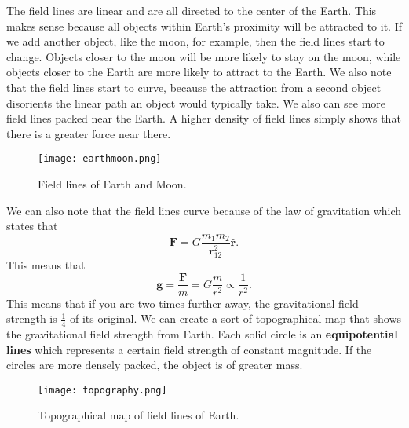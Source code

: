 \documentclass[12pt]{article}
\let\vec\mathbf
\begin{document}
  The field lines are linear and are all directed to the center of the Earth. This makes sense because all objects within Earth's proximity will be attracted to it. If we add another object, like the moon, for example, then the field lines start to change. Objects closer to the moon will be more likely to stay on the moon, while objects closer to the Earth are more likely to attract to the Earth. We also note that the field lines start to curve, because the attraction from a second object disorients the linear path an object would typically take. We also can see more field lines packed near the Earth. A higher density of field lines simply shows that there is a greater force near there. 
          \begin{figure}[H]
  \centering
      \texttt{[image: earthmoon.png]}
      \caption{Field lines of Earth and Moon.}
  \end{figure}
  We can also note that the field lines curve because of the law of gravitation which states that 
  \[\vec F = G \frac{m_1 m_2}{\vec r_{12}^2}\hat{\mathbf{r}}.\]
  This means that 
  \[\vec g = \frac{\vec F}{m} = G \frac{m}{r^2}\propto \frac{1}{r^2}.\]
  This means that if you are two times further away, the gravitational field strength is $\frac{1}{4}$ of its original. We can create a sort of topographical map that shows the gravitational field strength from Earth. Each solid circle is an \textbf{equipotential lines} which represents a certain field strength of constant magnitude. If the circles are more densely packed, the object is of greater mass. 
            \begin{figure}[H]
  \centering
      \texttt{[image: topography.png]}
      \caption{Topographical map of field lines of Earth.}
  \end{figure}
\end{document}
